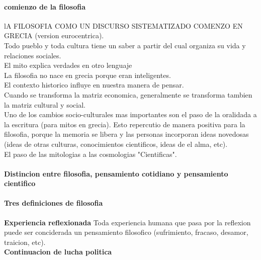 \documentclass[10pt]{article}
\begin{document}
 
\maketitle

\paragraph{comienzo de la filosofia}
lA FILOSOFIA COMO UN DISCURSO SISTEMATIZADO COMENZO EN GRECIA (version eurocentrica).\\
Todo pueblo y toda cultura tiene un saber a partir del cual organiza su vida y relaciones sociales.\\
\linebreak
El mito explica verdades en otro lenguaje\\
\linebreak
La filosofia no nace en grecia porque eran inteligentes.\\
\linebreak
El contexto historico influye en nuestra manera de pensar.\\
\linebreak
Cuando se transforma la matriz economica, generalmente se transforma tambien la matriz cultural y social.\\
\linebreak
Uno de los cambios socio-culturales mas importantes son el paso de la oralidada a la escritura (para mitos en grecia). Esto repercutio de manera positiva para la filosofia, porque la memoria se libera y las personas incorporan ideas novedosas (ideas de otras culturas, conocimientos cientificos, ideas de el alma, etc).\\
\linebreak
El paso de las mitologias a las cosmologias "Cientificas".

\paragraph{Distincion entre filosofia, pensamiento cotidiano y pensamiento cientifico}
\paragraph{Tres definiciones de filosofia}
\textbf{Experiencia reflexionada} Toda experiencia humana que pasa por la reflexion puede ser conciderada un pensamiento filosofico (sufrimiento, fracaso, desamor, traicion, etc).\\
\linebreak
\textbf{Continuacion de lucha politica}
%
\end{document}
